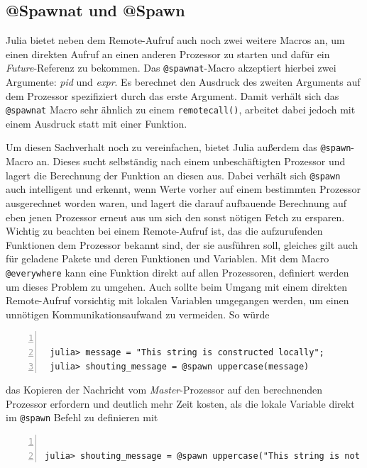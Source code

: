 \documentclass[proseminar,german,utf8]{zihpub}
\begin{document}
\subsection{@Spawnat und @Spawn}

Julia bietet neben dem Remote-Aufruf auch noch zwei weitere Macros an, um einen direkten Aufruf an einen anderen Prozessor zu starten und dafür ein \textit{Future}-Referenz zu bekommen. Das \verb|@spawnat|-Macro akzeptiert hierbei zwei Argumente: \textit{pid} und \textit{expr}. Es berechnet den Ausdruck des zweiten Arguments auf dem Prozessor spezifiziert durch das erste Argument.  Damit verhält sich das \verb|@spawnat| Macro sehr ähnlich zu einem \verb|remotecall()|, arbeitet dabei jedoch mit einem Ausdruck statt mit einer Funktion. 

Um diesen Sachverhalt noch zu vereinfachen, bietet Julia außerdem das \verb|@spawn|-Macro an. Dieses sucht selbständig nach einem unbeschäftigten Prozessor und lagert die Berechnung der Funktion an diesen aus. Dabei verhält sich \verb|@spawn| auch intelligent und erkennt, wenn Werte vorher auf einem bestimmten Prozessor ausgerechnet worden waren, und lagert die darauf aufbauende Berechnung auf eben jenen Prozessor erneut aus um sich den sonst nötigen Fetch zu ersparen. Wichtig zu beachten bei einem Remote-Aufruf ist, das die aufzurufenden Funktionen dem Prozessor bekannt sind, der sie ausführen soll, gleiches gilt auch für geladene Pakete und deren Funktionen und Variablen. Mit dem Macro \verb|@everywhere| kann eine Funktion direkt auf allen Prozessoren, definiert werden um dieses Problem zu umgehen. Auch sollte beim Umgang mit einem direkten Remote-Aufruf vorsichtig mit lokalen Variablen umgegangen werden, um einen unnötigen Kommunikationsaufwand zu vermeiden. So würde

\begin{Verbatim}[baselinestretch=1,fontsize=\scriptsize,numbers=left,stepnumber=5,xleftmargin=1cm,xrightmargin=1cm]

 julia> message = "This string is constructed locally";
 julia> shouting_message = @spawn uppercase(message)

\end{Verbatim} 

das Kopieren der Nachricht vom \textit{Master}-Prozessor auf den berechnenden Prozessor erfordern und deutlich mehr Zeit kosten, als die lokale Variable direkt im \verb|@spawn| Befehl zu definieren mit 
\begin{Verbatim}[baselinestretch=1,fontsize=\scriptsize,numbers=left,stepnumber=5,xleftmargin=1cm]

julia> shouting_message = @spawn uppercase("This string is not constructed locally")

\end{Verbatim}
\end{document}
